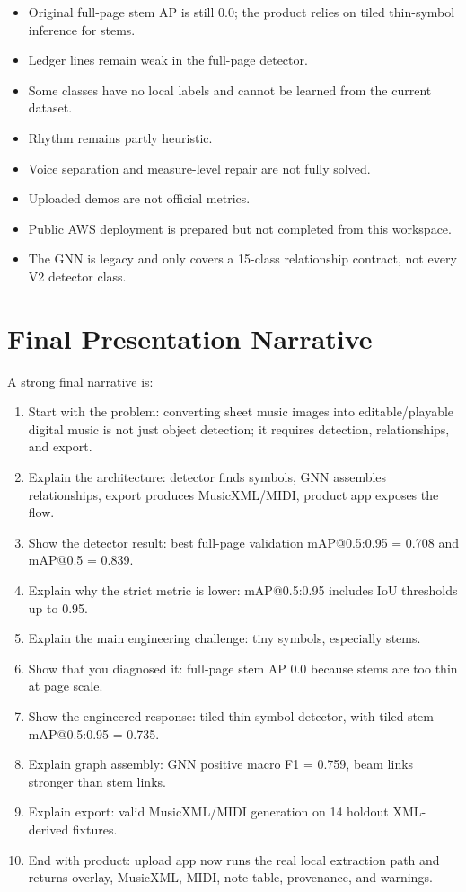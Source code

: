 \documentclass[11pt]{article}
\begin{document}
\begin{itemize}
  \item Original full-page stem AP is still 0.0; the product relies on tiled thin-symbol inference for stems.
  \item Ledger lines remain weak in the full-page detector.
  \item Some classes have no local labels and cannot be learned from the current dataset.
  \item Rhythm remains partly heuristic.
  \item Voice separation and measure-level repair are not fully solved.
  \item Uploaded demos are not official metrics.
  \item Public AWS deployment is prepared but not completed from this workspace.
  \item The GNN is legacy and only covers a 15-class relationship contract, not every V2 detector class.
\end{itemize}

\section{Final Presentation Narrative}

A strong final narrative is:

\begin{enumerate}
  \item Start with the problem: converting sheet music images into editable/playable digital music is not just object detection; it requires detection, relationships, and export.
  \item Explain the architecture: detector finds symbols, GNN assembles relationships, export produces MusicXML/MIDI, product app exposes the flow.
  \item Show the detector result: best full-page validation mAP@0.5:0.95 = 0.708 and mAP@0.5 = 0.839.
  \item Explain why the strict metric is lower: mAP@0.5:0.95 includes IoU thresholds up to 0.95.
  \item Explain the main engineering challenge: tiny symbols, especially stems.
  \item Show that you diagnosed it: full-page stem AP 0.0 because stems are too thin at page scale.
  \item Show the engineered response: tiled thin-symbol detector, with tiled stem mAP@0.5:0.95 = 0.735.
  \item Explain graph assembly: GNN positive macro F1 = 0.759, beam links stronger than stem links.
  \item Explain export: valid MusicXML/MIDI generation on 14 holdout XML-derived fixtures.
  \item End with product: upload app now runs the real local extraction path and returns overlay, MusicXML, MIDI, note table, provenance, and warnings.
\end{enumerate}
\end{document}
